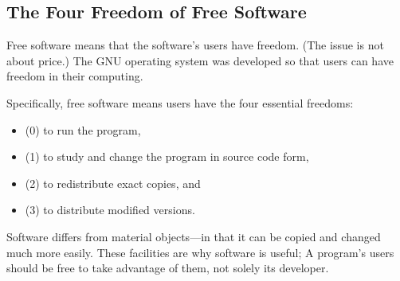 \documentclass[a4paper,12pt]{article}
\begin{document}
\newpage
\subsection*{The Four Freedom of Free Software}
Free software means that the software's users have freedom. (The issue is not about price.) The GNU operating system was developed so that users can have freedom in their computing.

Specifically, free software means users have the four essential freedoms: 
\begin{itemize}
\item(0) to run the program, 
\item(1) to study and change the program in source code form, 
\item(2) to redistribute exact copies, and 
\item(3) to distribute modified versions.
\end{itemize}

Software differs from material objects—in that it can be copied and changed much more easily. These facilities are why software is useful; A program's users should be free to take advantage of them, not solely its developer.
\end{document}
